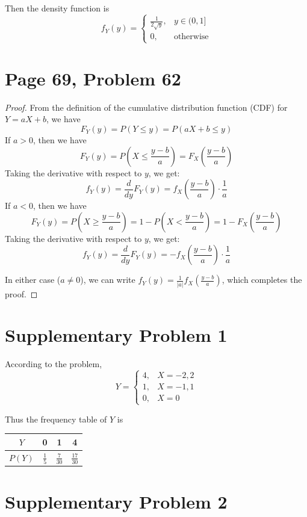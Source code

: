 \documentclass[a4paper, UTF-8]{article}
\theoremstyle{plain}
\begin{document}
Then the density function is
$$
f_Y(y) = \begin{cases}
\frac{1}{2\sqrt{y}}, & y \in (0, 1] \\
0, & \text{otherwise}
\end{cases}
$$

\section{Page 69, Problem 62}

\begin{proof} 

From the definition of the cumulative distribution function (CDF) for $Y = aX + b$, we have
$$
F_Y(y) = P(Y \leq y) = P(aX + b \leq y)
$$
If $a > 0$, then we have
$$
F_Y(y) = P\left(X \leq \frac{y - b}{a}\right) = F_X\left(\frac{y - b}{a}\right)
$$
Taking the derivative with respect to $y$, we get:
$$
f_Y(y) = \frac{d}{dy}F_Y(y) = f_X\left(\frac{y - b}{a}\right) \cdot \frac{1}{a}
$$
If $a < 0$, then we have
$$
F_Y(y) = P\left(X \geq \frac{y - b}{a}\right) = 1 - P\left(X < \frac{y - b}{a}\right) = 1 - F_X\left(\frac{y - b}{a}\right)
$$
Taking the derivative with respect to $y$, we get:
$$
f_Y(y) = \frac{d}{dy}F_Y(y) = -f_X\left(\frac{y - b}{a}\right) \cdot \frac{1}{a}
$$

In either case ($a \neq 0$), we can write $f_Y(y) = \frac{1}{|a|} f_X\left(\frac{y - b}{a}\right)$, which completes the proof.
\end{proof}

\section{Supplementary Problem 1}

According to the problem, 
$$
Y = \begin{cases}
4, & X = -2, 2 \\ 
1, & X = -1, 1 \\ 
0, & X = 0
\end{cases}
$$

Thus the frequency table of $Y$ is
\begin{center}
\begin{tabular}{c|c|c|c}
$Y$ & 0 & 1 & 4 \\
\hline
$P(Y)$ & $\frac{1}{5}$ & $\frac{7}{30}$ & $\frac{17}{30}$
\end{tabular}
\end{center}

\section{Supplementary Problem 2}
\end{document}
